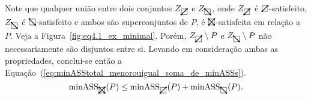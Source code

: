 Note que qualquer união entre dois conjuntos $Z_{\rectpos}$ e $Z_{\rectneg}$, onde $Z_{\rectpos}$ é $\rectpos$-satisfeito, $Z_{\rectneg}$ é $\rectneg$-satisfeito e ambos são superconjuntos de $P$, é $\recttotal$-satisfeita em relação a $P$. Veja a Figura~\ref{fig:eq4.1_ex_minimal}. Porém, $Z_{\rectpos} \setminus P$ e $Z_{\rectneg} \setminus P$ não necessariamente são disjuntos entre si. Levando em consideração ambas as propriedades, conclui-se então a Equação~(\ref{eq:minASStotal_menorouigual_soma_de_minASSs}).
\begin{equation} \label{eq:minASStotal_menorouigual_soma_de_minASSs}
    \text{minASS}_{\recttotal}(P) \leq \text{minASS}_{\rectpos}(P) + \text{minASS}_{\rectneg}(P).
\end{equation}

